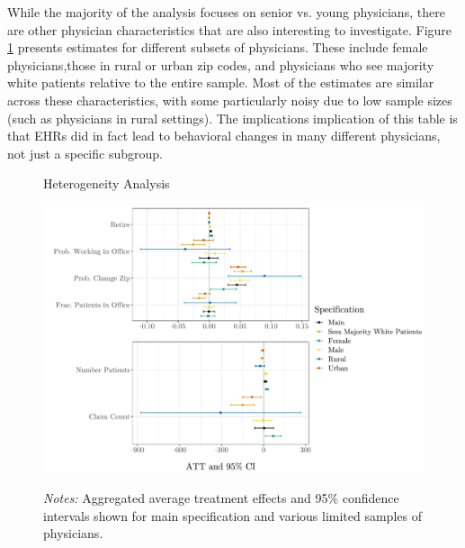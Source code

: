 \documentclass[12pt]{article}
\begin{document}
While the majority of the analysis focuses on senior vs. young physicians, there are other physician characteristics that are also interesting to investigate. Figure \ref{fig:het} presents estimates for different subsets of physicians. These include female physicians,those in rural or urban zip codes, and physicians who see majority white patients relative to the entire sample. Most of the estimates are similar across these characteristics, with some particularly noisy due to low sample sizes (such as physicians in rural settings). The implications implication of this table is that EHRs did in fact lead to behavioral changes in many different physicians, not just a specific subgroup.  

\begin{figure}[ht]
    \centering
    \captionsetup{width=.65\linewidth}
    \caption{Heterogeneity Analysis}
    \includegraphics[scale=.65]{Objects/heterogeneity _graph.pdf}
    \label{fig:het}
    \vspace{2mm}
    \caption*{\footnotesize{\textit{Notes:} Aggregated average treatment effects and 95\% confidence intervals shown for main specification and various limited samples of physicians.}}
\end{figure}
\end{document}
